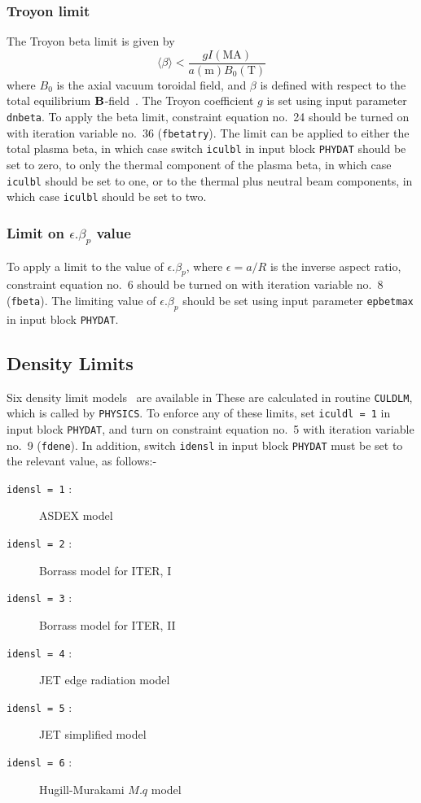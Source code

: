 \subsubsection{Troyon limit \protect\cite{IPDG,172}}

The Troyon beta limit is given by
\begin{equation}
\langle \beta \rangle < \frac{gI(\mbox{MA})}{a(\mbox{m})B_0(\mbox{T})}
\label{eq:troyon}
\end{equation}
where $B_0$ is the axial vacuum toroidal field, and $\beta$ is defined with
respect to the total equilibrium ${\bf B}$-field~\cite{172}. The Troyon
coefficient $g$ is set using input parameter {\tt dnbeta}. To apply the beta
limit, constraint equation no.\ 24 should be turned on with iteration variable
no.\ 36 ({\tt fbetatry}). The limit can be applied to either the total plasma
beta, in which case switch {\tt iculbl} in input block {\tt PHYDAT} should be
set to zero, to only the thermal component of the plasma beta, in which
case {\tt iculbl} should be set to one, or to the thermal plus neutral beam
components, in which case {\tt iculbl} should be set to two.

\subsubsection{Limit on $\epsilon.\beta_p$ value}

To apply a limit to the value of $\epsilon.\beta_p$, where $\epsilon = a/R$ is
the inverse aspect ratio, constraint equation no.\ 6 should be turned on with
iteration variable no.\ 8 ({\tt fbeta}). The limiting value of
$\epsilon.\beta_p$ should be set using input parameter {\tt epbetmax} in input
block {\tt PHYDAT}.

\subsection{Density Limits}

Six density limit models~\cite{172} are available in \PSD These are calculated
in routine {\tt CULDLM}, which is called by {\tt PHYSICS}.  To enforce any of
these limits, set {\tt iculdl = 1} in input block {\tt PHYDAT}, and turn on
constraint equation no.~5 with iteration variable no.~9 ({\tt fdene}).  In
addition, switch {\tt idensl} in input block {\tt PHYDAT} must be set to the
relevant value, as follows:-
\begin{description}
\item [{\tt idensl = 1} :] ASDEX model
\item [{\tt idensl = 2} :] Borrass model for ITER, I
\item [{\tt idensl = 3} :] Borrass model for ITER, II
\item [{\tt idensl = 4} :] JET edge radiation model
\item [{\tt idensl = 5} :] JET simplified model
\item [{\tt idensl = 6} :] Hugill-Murakami $M.q$ model
\end{description}

